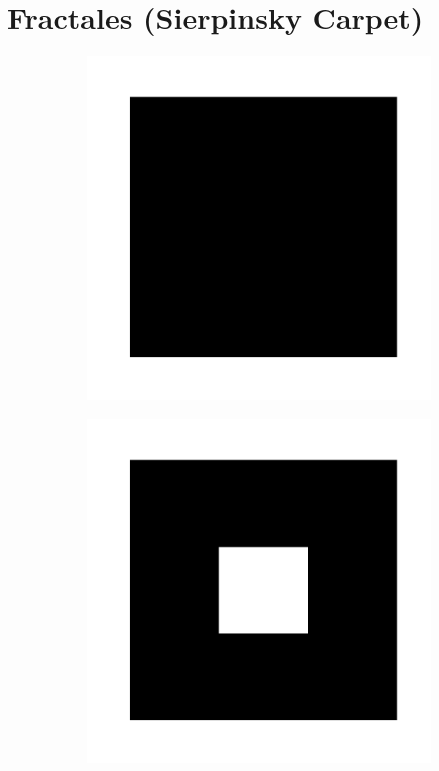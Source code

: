 \section{Fractales (Sierpinsky Carpet)}
\label{sc:Fractales}

\begin{figure}[tbh!]
     \centering
    \captionsetup[sub]{font=small}

     \begin{subfigure}[b!]{0.25 \textwidth}
         \caption{}
         \includegraphics[width=\textwidth]{Imagenes/Fractal/sierpinski_carpet_1.pdf}
     \end{subfigure}\hspace*{-0.9em}
     \begin{subfigure}[b!]{0.25 \textwidth}
         \caption{}
         \includegraphics[width=\textwidth]{Imagenes/Fractal/sierpinski_carpet_2.pdf}

\end{subfigure}
\end{figure}
